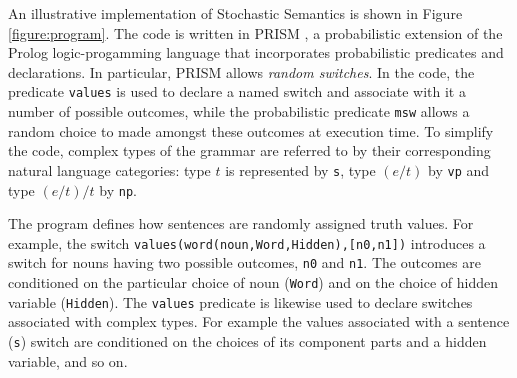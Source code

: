 \documentclass[a4paper,11pt]{article}
\renewcommand{\cite}{\citep}
\theoremstyle{definition}
\begin{document}




An illustrative implementation of Stochastic Semantics is shown in Figure \ref{figure:program}. The code is written in PRISM  \cite{Sato:97}, a probabilistic extension of the Prolog logic-progamming language that incorporates probabilistic predicates and declarations. In particular, PRISM allows {\em random switches}. In the code, the predicate \texttt{values} is used to declare a named switch and associate with it a number of possible outcomes, while the probabilistic predicate \texttt{msw} allows a random choice to made amongst these outcomes at execution time. To simplify the code, complex types of the grammar are referred to by their corresponding natural language
categories: type $t$ is represented by \texttt{s}, type $(e/t)$ by \texttt{vp} and type $(e/t)/t$ by \texttt{np}. 

The program defines how sentences are randomly assigned truth values. For example, the switch
\texttt{values(word(noun,Word,Hidden),[n0,n1])} 
introduces a switch for nouns having two possible outcomes, \texttt{n0} and \texttt{n1}.
The outcomes are conditioned on the particular choice of noun (\texttt{Word}) and on the choice of hidden variable (\texttt{Hidden}). The \texttt{values} predicate is likewise used to declare switches associated with complex types. For example the values associated with a sentence (\texttt{s}) switch are conditioned on the choices of its component parts and a hidden variable, and so on.
\end{document}
